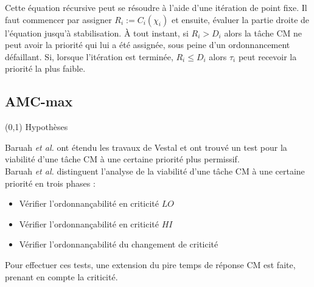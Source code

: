 \documentclass[12pt,a4paper,oneside]{book}
\theoremstyle{break}
\theoremstyle{breakplain}
\begin{document}
Cette équation récursive peut se résoudre à l'aide d'une itération de point fixe. Il faut commencer par assigner $R_i := C_i(\chi_i)$ et ensuite, évaluer la partie droite de l'équation jusqu'à stabilisation. À tout instant, si $R_i > D_i$ alors la tâche CM ne peut avoir la priorité qui lui a été assignée, sous peine d'un ordonnancement défaillant. Si, lorsque l'itération est terminée, $R_i \leq D_i$ alors $\tau_i$ peut recevoir la priorité la plus faible.

\subsection{AMC-max}

\begin{center}
\boxput*(0,1){
\colorbox{white}{Hypothèses}
}{
\setlength{\fboxsep}{6pt}
}
\end{center}
Baruah \textit{et al.} ont étendu les travaux de Vestal et ont trouvé un test pour la viabilité d'une tâche CM à une certaine priorité plus permissif. \cite{baruah2011response}\\
Baruah \textit{et al.} distinguent l'analyse de la viabilité d'une tâche CM à une certaine priorité en trois phases :

\begin{itemize}
\item Vérifier l'ordonnançabilité en criticité $LO$
\item Vérifier l'ordonnançabilité en criticité $HI$
\item Vérifier l'ordonnançabilité du changement de criticité
\end{itemize}
Pour effectuer ces tests, une extension du pire temps de réponse CM est faite, prenant en compte la criticité.\\
\end{document}
